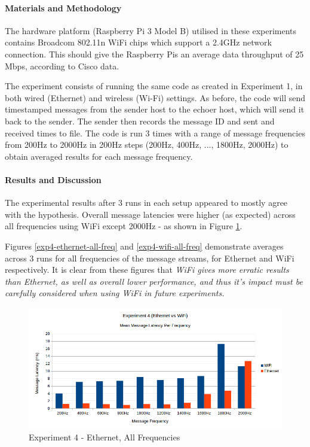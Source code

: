 \documentclass[../dissertation.tex]{subfiles}
\begin{document}
\paragraph{Materials and Methodology} The hardware platform (Raspberry Pi 3 Model B) utilised in these experiments contains Broadcom 802.11n WiFi chips which support a 2.4GHz network connection. This should give the Raspberry Pis an average data throughput of 25 Mbps, according to Cisco data\cite{florwick2013wireless}.

The experiment consists of running the same code as created in Experiment 1\cite{Experiment1NoEchoDelayCode}, in both wired (Ethernet) and wireless (Wi-Fi) settings. As before, the code will send timestamped messages from the sender host to the echoer host, which will send it back to the sender. The sender then records the message ID and sent and received times to file. The code is run 3 times with a range of message frequencies from 200Hz to 2000Hz in 200Hz steps (200Hz, 400Hz, ..., 1800Hz, 2000Hz) to obtain averaged results for each message frequency.

\paragraph{Results and Discussion} The experimental results after 3 runs in each setup appeared to mostly agree with the hypothesis. Overall message latencies were higher (as expected) across all frequencies using WiFi except 2000Hz - as shown in Figure \ref{exp4-means-all-freq}.

Figures \ref{exp4-ethernet-all-freq} and \ref{exp4-wifi-all-freq} demonstrate averages across 3 runs for all frequencies of the message streams, for Ethernet and WiFi respectively. It is clear from these figures that \textit{WiFi gives more erratic results than Ethernet, as well as overall lower performance, and thus it's impact must be carefully considered when using WiFi in future experiments.}

\begin{figure}[H]
\centering
\includegraphics[width=\textwidth]{images/experiment4/mean_per_frequency.png}
\caption{Experiment 4 - Ethernet, All Frequencies}
\label{exp4-means-all-freq}
\end{figure}
\end{document}
